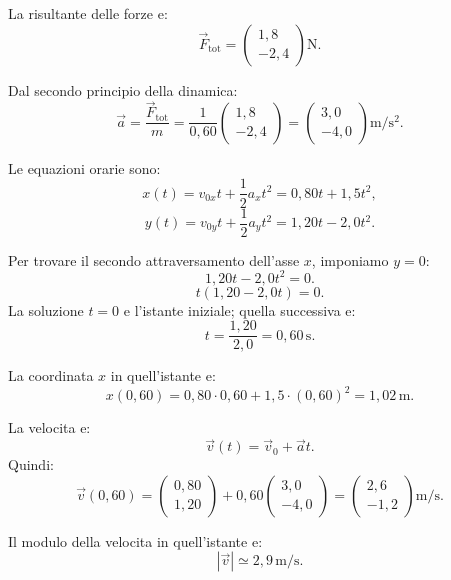 \begin{soluzione}
La risultante delle forze e:
\[
\vec F_\text{tot}=
\begin{pmatrix}
1{,}8\\[4pt]
-2{,}4
\end{pmatrix}
\mathrm{N}.
\]

Dal secondo principio della dinamica:
\[
\vec a=\frac{\vec F_\text{tot}}{m}
=\frac{1}{0{,}60}
\begin{pmatrix}
1{,}8\\[4pt]
-2{,}4
\end{pmatrix}
=
\begin{pmatrix}
3{,}0\\[4pt]
-4{,}0
\end{pmatrix}
\mathrm{m/s^2}.
\]

Le equazioni orarie sono:
\[
x(t)=v_{0x}t+\frac{1}{2}a_xt^2
=0{,}80t+1{,}5t^2,
\]
\[
y(t)=v_{0y}t+\frac{1}{2}a_yt^2
=1{,}20t-2{,}0t^2.
\]

Per trovare il secondo attraversamento dell'asse \(x\), imponiamo \(y=0\):
\[
1{,}20t-2{,}0t^2=0.
\]
\[
t(1{,}20-2{,}0t)=0.
\]
La soluzione \(t=0\) e l'istante iniziale; quella successiva e:
\[
t=\frac{1{,}20}{2{,}0}=0{,}60\,\mathrm{s}.
\]

La coordinata \(x\) in quell'istante e:
\[
x(0{,}60)=0{,}80\cdot 0{,}60+1{,}5\cdot (0{,}60)^2
=1{,}02\,\mathrm{m}.
\]

La velocita e:
\[
\vec v(t)=\vec v_0+\vec a t.
\]
Quindi:
\[
\vec v(0{,}60)=
\begin{pmatrix}
0{,}80\\[4pt]
1{,}20
\end{pmatrix}
+
0{,}60
\begin{pmatrix}
3{,}0\\[4pt]
-4{,}0
\end{pmatrix}
=
\begin{pmatrix}
2{,}6\\[4pt]
-1{,}2
\end{pmatrix}
\mathrm{m/s}.
\]

Il modulo della velocita in quell'istante e:
\[
|\vec v|\simeq 2{,}9\,\mathrm{m/s}.
\]
\end{soluzione}
